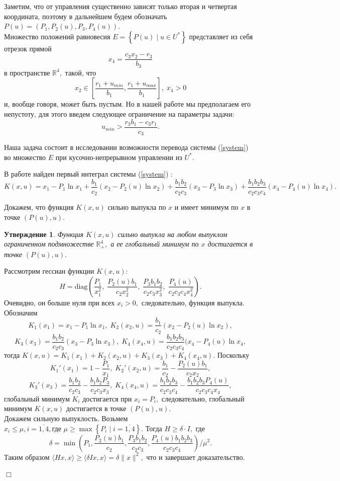 \documentclass[11pt]{article}
\newtheorem{statement}{Утверждение}
\newenvironment{Proof}
{\par\noindent{\bf Доказательство.\\}} 
{\begin{flushright}$\Box$\end{flushright}}
\newcommand\Set[2]{\left\{ #1 \mid #2 \right\}}
\newcommand\Ref[1]{(\ref{#1})}
\newcommand\ftw[2]{\overline{#1,#2}}
\newcommand\RS{\Ref{system} }
\newcommand\beq{\begin{equation}}
\newcommand\eeq{\end{equation}}
\begin{document}
Заметим, что от управления существенно зависят только вторая и четвертая координата, поэтому в дальнейшем будем обозначать $P(u) = (P_1, P_2(u), P_3, P_4(u)).$ \\

Множество положений равновесия $E = \Set{P(u)}{u \in U^*}$ представляет из себя отрезок прямой 
$$x_4 = \frac{c_3x_2 - r_3}{b_3}$$ 
в пространстве $\mathbb{R}^4,$ такой, что
$$x_2 \in \left[\frac{r_1 + u_{min}}{b_1}, \frac{r_1 + u_{max}}{b_1}\right], \; x_4 > 0$$ 
 и, вообще говоря, может быть пустым. Но в нашей работе мы предполагаем его непустоту, для этого введем следующее ограничение на параметры задачи:
$$u_{min} > \frac{r_3b_1 - c_3r_1}{c_3}.$$

Наша задача состоит в исследовании возможности перевода системы \RS во множество $E$ при кусочно-непрерывном управлении из $U^*.$ 

В работе \cite{MathBio} найден первый интеграл системы \RS:
\beq
	K(x,u) = x_1 - P_1\ln x_1 + \frac{b_1}{c_2}(x_2 - P_2(u)\ln x_2) + \frac{b_1b_2}{c_2c_3}(x_3 - P_3\ln x_3) + \frac{b_1b_2b_3}{c_2c_3c_4}(x_4 - P_4(u)\ln x_4).
\eeq

Докажем, что функция $K(x,u)$ сильно выпукла по $x$ и имеет минимум по $x$ в точке $(P(u),u).$

\begin{statement}
	Функция $K(x,u)$ сильно выпукла на любом выпуклом ограниченном подмножестве $\mathbb{R}_+^4,$ а ее глобальный минимум по $x$ достигается в точке $(P(u),u).$
\end{statement}
\begin{Proof}
	Рассмотрим гессиан функции $K(x,u):$
	$$H = \text{diag} \left(\frac{P_1}{x_1^2}, \; \frac{P_2(u)b_1}{c_2x_2^2}, \; \frac{P_3b_1b_2}{c_2c_3x_3^2}, \; \frac{P_4(u)}{c_2c_3c_4x_4^2}\right).$$
	Очевидно, он больше нуля при всех $x_i > 0,$ следовательно, функция выпукла.\\
	Обозначим 
	$$K_1(x_1) = x_1 - P_1\ln x_1, \; K_2(x_2,u) = \frac{b_1}{c_2}(x_2 - P_2(u)\ln x_2),$$
	$$K_3(x_3) = \frac{b_1b_2}{c_2c_3}(x_3 - P_3\ln x_3), \; K_4(x_4,u) = \frac{b_1b_2b_3}{c_2c_3c_4}(x_4 - P_4(u)\ln x_4,$$ тогда $K(x,u) =  K_1(x_1) + K_2(x_2,u) + K_3(x_3) + K_4(x_4,u).$  Поскольку 
	$$K_1'(x_1) = 1 - \frac{P_1}{x_1}, \; K_2'(x_2,u) = \frac{b_1}{c_2} - \frac{P_2(u)b_1}{c_2x_2},$$
	$$K_3'(x_3) = \frac{b_1b_2}{c_2c_3} - \frac{b_1b_2P_3}{c_2c_3x_3}, \; K_4(x_4,u) = \frac{b_1b_2b_3}{c_2c_3c_4} - \frac{b_1b_2b_3P_4(u)}{c_2c_3c_4x_4},$$ 
	глобальный минимум $K_i$ достигается при $x_i = P_i,$ следовательно, глобальный минимум $K(x,u)$ достигается в точке $(P(u),u).$ \\
	 Докажем сильную выпуклость. Возьмем $x_i \leqslant \mu, i = \ftw{1}{4}, \text{где } \mu \geqslant \max\Set{P_i}{i = \ftw{1}{4}}.$ Тогда $H \geqslant \delta\cdot I,$ где  
	 $$\delta = \min\left(P_1, \frac{P_2(u)b_1}{c_2}, \frac{P_3b_1b_2}{c_2c_3}, \frac{P_4(u)b_1b_2b_3}{c_2c_3c_4}\right)/\mu^2.$$
	 Таким образом $\langle Hx,x \rangle \geqslant \langle \delta Ix,x \rangle = \delta \|x\|^2,$ что и завершает доказательство.
\end{Proof}
\end{document}
